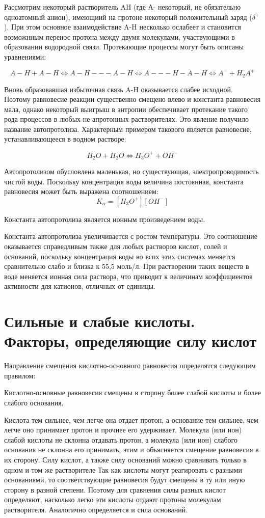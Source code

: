 \documentclass[14pt,a4paper]{scrartcl}
\begin{document}
Рассмотрим некоторый растворитель AH (где А- некоторый, не обязательно одноатомный анион), имеющиий на протоне некоторый положительный заряд ($\delta^+$). При этом основное взаимодействие A-H несколько ослабеет и становится возможнным перенос протона между двумя молекулами, участвующими в образовании водородной связи. Протекающие процессы могут быть описаны уравнениями:

$$A-H + A-H \Leftrightarrow A-H---A-H \Leftrightarrow A---H-A-H \Leftrightarrow A^- + H_2A^+$$

Вновь образовавшая избыточная связь A-H оказывается слабее исходной. Поэтому  равновесие реакции существенно смещено влево и константа равновесия мала, однако некоторый выигрыш в энтропии обеспечивает протекание такого рода процессов в любых не апротонных растворителях. Это явление получило название автопротолиза. Характерным примером такового является равновесие, устанавливающееся в водном растворе:

$$H_2O + H_2O \Leftrightarrow H_3O^+ + OH^-$$

Автопротолизом обусловлена маленькая, но существующая, электропроводимость чистой воды. Поскольку концентрация воды величина постоянная, константа равновесия может быть выражена соотношением: 
$$K_{\alpha} = \left[H_3O^+\right]\left[OH^-\right]$$

Константа автопротолиза является ионным произведением воды.

Константа автопротолиза увеличивается  с ростом температуры. Это соотношение оказывается справедливым также для любых растворов кислот, солей и оснований, поскольку концентрация воды во вспх этих системах меняется сравнительно слабо и близка к 55,5 моль/л. При растворении таких веществ в воде меняется ионная сила раствора, что приводит к величинам коэффициентов активности для катионов, отличных от единицы.

\section*{Сильные и слабые кислоты. Факторы, определяющие силу кислот}

Направление смещения кислотно-основного равновесия определятся следующим правилом:

Кислотно-основные равновесия смещены в сторону более слабой кислоты и более слабого основания.

Кислота тем сильнее, чем легче она отдает протон, а основание тем сильнее, чем легче оно принимает протон и прочнее его удерживает. Молекула (или ион) слабой кислоты не склонна отдавать протон, а молекула (или ион) слабого основания не склонна его принимать, этим и объясняется смещение равновесия в их сторону. Силу кислот, а также силу оснований можно сравнивать только в одном и том же растворителе
Так как кислоты могут реагировать с разными основаниями, то соответствующие равновесия будут смещены в ту или иную сторону в разной степени. Поэтому для сравнения силы разных кислот определяют, насколько легко эти кислоты отдают протоны молекулам растворителя. Аналогично определяется и сила оснований.
\end{document}
